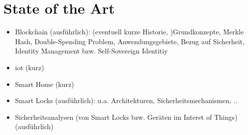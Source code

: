 \section{State of the Art}
\label{sec:sota}
    \begin{itemize}
        \item Blockchain (ausführlich): (eventuell kurze Historie, )Grundkonzepte, Merkle Hash, Double-Spending Problem, Anwendungsgebiete, Bezug auf Sicherheit, Identity Management bzw. Self-Sovereign Identitiy
        \item \gls{iot} (kurz)
        \item Smart Home (kurz)
        \item Smart Locks (ausführlich): u.a. Architekturen, Sicherheitsmechanismen, ..
        \item Sicherheitsanalysen (von Smart Locks bzw. Geräten im Interet of Things) (ausführlich)
    \end{itemize}
    
    

 